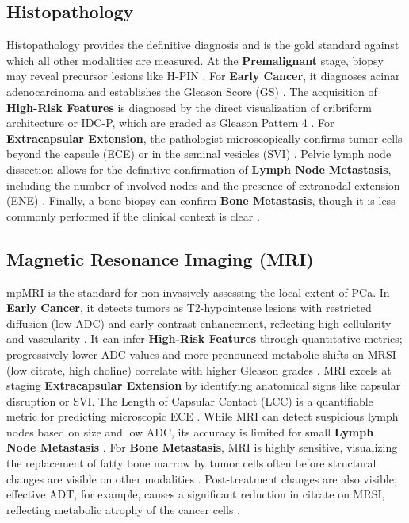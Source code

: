 \documentclass[11pt, a4paper]{article}
\begin{document}
\subsection{Histopathology}
Histopathology provides the definitive diagnosis and is the gold standard against which all other modalities are measured. At the \textbf{Premalignant} stage, biopsy may reveal precursor lesions like H-PIN \cite{UnknownAuthor2017}. For \textbf{Early Cancer}, it diagnoses acinar adenocarcinoma and establishes the Gleason Score (GS) \cite{UnknownAuthor2014, TruongFrye2018}. The acquisition of \textbf{High-Risk Features} is diagnosed by the direct visualization of cribriform architecture or IDC-P, which are graded as Gleason Pattern 4 \cite{GordetskySchaffer2022}. For \textbf{Extracapsular Extension}, the pathologist microscopically confirms tumor cells beyond the capsule (ECE) or in the seminal vesicles (SVI) \cite{OliveiraFerreira2023}. Pelvic lymph node dissection allows for the definitive confirmation of \textbf{Lymph Node Metastasis}, including the number of involved nodes and the presence of extranodal extension (ENE) \cite{CaglicBarrett2018}. Finally, a bone biopsy can confirm \textbf{Bone Metastasis}, though it is less commonly performed if the clinical context is clear \cite{GoodeWang2023}.

\subsection{Magnetic Resonance Imaging (MRI)}
mpMRI is the standard for non-invasively assessing the local extent of PCa. In \textbf{Early Cancer}, it detects tumors as T2-hypointense lesions with restricted diffusion (low ADC) and early contrast enhancement, reflecting high cellularity and vascularity \cite{CarpagnanoEusebi2020, KurhanewiczSwanson2002}. It can infer \textbf{High-Risk Features} through quantitative metrics; progressively lower ADC values and more pronounced metabolic shifts on MRSI (low citrate, high choline) correlate with higher Gleason grades \cite{DuenwegBobholz2023, KurhanewiczSwanson2002}. MRI excels at staging \textbf{Extracapsular Extension} by identifying anatomical signs like capsular disruption or SVI. The Length of Capsular Contact (LCC) is a quantifiable metric for predicting microscopic ECE \cite{PriesterMota2024, CaglicKovac2019}. While MRI can detect suspicious lymph nodes based on size and low ADC, its accuracy is limited for small \textbf{Lymph Node Metastasis} \cite{CaglicKovac2019}. For \textbf{Bone Metastasis}, MRI is highly sensitive, visualizing the replacement of fatty bone marrow by tumor cells often before structural changes are visible on other modalities \cite{DammeTombal2021}. Post-treatment changes are also visible; effective ADT, for example, causes a significant reduction in citrate on MRSI, reflecting metabolic atrophy of the cancer cells \cite{KurhanewiczSwanson2002}.
\end{document}
